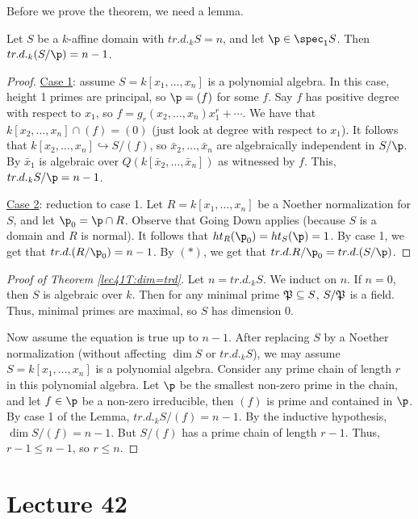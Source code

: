  Before we prove the theorem, we need a lemma.
 \begin{lemma}
   Let $S$ be a $k$-affine domain with $tr.d._k S=n$, and let $\p\in \spec_1 S$. Then
   $tr.d._k (S/\p)=n-1$.
 \end{lemma}
 \begin{proof}
   \underline{Case 1}: assume $S=k[x_1,\dots, x_n]$ is a polynomial algebra. In this
   case, height 1 primes are principal, so $\p=(f)$ for some $f$. Say $f$ has positive
   degree with respect to $x_1$, so $f = g_r(x_2,\dots, x_n)x_1^r + \cdots$. We have
   that $k[x_2,\dots, x_n]\cap (f)=(0)$ (just look at degree with respect to $x_1$). It
   follows that $k[x_2,\dots, x_n]\hookrightarrow S/(f)$, so $\bar x_2,\dots, \bar x_n$
   are algebraically independent in $S/\p$. By $\bar x_1$ is algebraic over $Q(k[\bar
   x_2,\dots, \bar x_n])$ as witnessed by $f$. This, $tr.d._k S/\p=n-1$.

   \underline{Case 2}: reduction to case 1. Let $R=k[x_1,\dots, x_n]$ be a Noether
   normalization for $S$, and let $\p_0=\p\cap R$. Observe that Going Down applies
   (because $S$ is a domain and $R$ is normal). It follows that $ht_R(\p_0)=ht_S(\p)=1$.
   By case 1, we get that $tr.d. (R/\p_0)=n-1$. By $(\ast)$, we get that $tr.d.
   R/\p_0=tr.d. (S/\p)$.
 \end{proof}
 \begin{proof}[Proof of Theorem \ref{lec41T:dim=trd}]
   Let $n=tr.d._k S$. We induct on $n$. If $n=0$, then $S$ is algebraic over $k$. Then
   for any minimal prime $\P\subseteq S$, $S/\P$ is a field. Thus, minimal primes are
   maximal, so $S$ has dimension 0.

   Now assume the equation is true up to $n-1$. After replacing $S$ by a Noether
   normalization (without affecting $\dim S$ or $tr.d._k S$), we may assume
   $S=k[x_1,\dots, x_n]$ is a polynomial algebra. Consider any prime chain of length $r$
   in this polynomial algebra. Let $\p$ be the smallest non-zero prime in the chain, and
   let $f\in \p$ be a non-zero irreducible, then $(f)$ is prime and contained in $\p$. By
   case 1 of the Lemma, $tr.d._k S/(f)=n-1$. By the inductive hypothesis, $\dim
   S/(f)=n-1$. But $S/(f)$ has a prime chain of length $r-1$. Thus, $r-1\le n-1$, so
   $r\le n$.
 \end{proof}
 \setcounter{lecture}{42}
 \section{Lecture 42}

